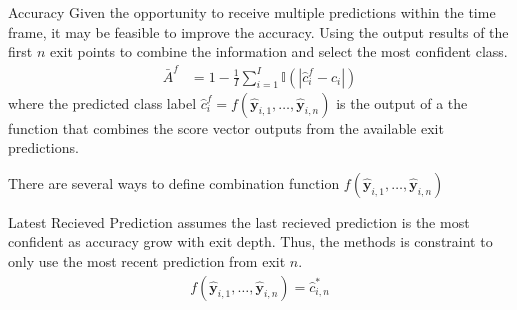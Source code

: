 \begin{enumdescript}
\begin{enumdescript}
	\end{enumdescript}
	
	\item[Accuracy] Given the opportunity to receive multiple predictions within the time frame, it may be feasible to improve the accuracy. Using the output results of the first $ n $ exit points to combine the information and select the most confident class. 
	\begin{align}
	\bar{A}^f &= 1 - \frac{1}{I} \sum_{i=1}^{I}\mathbb{I}\left(\left|\hat{c}_i^f-c_i\right|\right)
	\end{align}
	where the predicted class label $ \hat{c}_i^f = f(\bm{\hat{y}}_{i,1},\dots, \bm{\hat{y}}_{i,n}) $ is the output of a the function that combines the score vector outputs from the available exit predictions. 
	
	There are several ways to define combination function $ f\left(\bm{\hat{y}}_{i,1}, \dots, \bm{\hat{y}}_{i,n}\right) $
	\begin{enumdescript}
		
		\item[Latest Recieved Prediction] assumes the last recieved prediction is the most confident as accuracy grow with exit depth. Thus, the methods is constraint to only use the most recent prediction from exit $n$.
		\begin{align}
		f\left(\bm{\hat{y}}_{i,1}, \dots, \bm{\hat{y}}_{i,n} \right) = \hat{c}_{i,n}^{*}
		\end{align}
		

\end{enumdescript}
\end{enumdescript}
